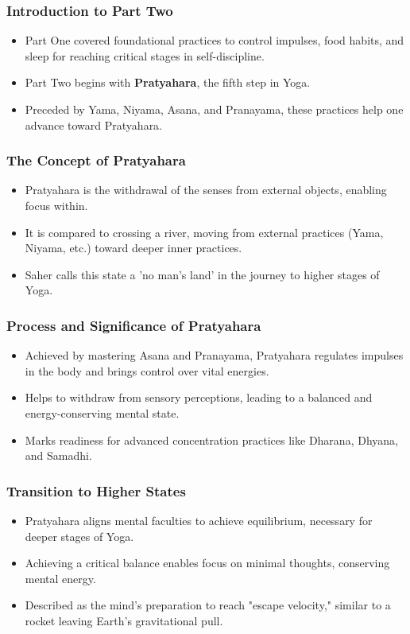 \begin{frame}[fragile]\frametitle{Introduction to Part Two}
    \begin{itemize}
        \item Part One covered foundational practices to control impulses, food habits, and sleep for reaching critical stages in self-discipline.
        \item Part Two begins with \textbf{Pratyahara}, the fifth step in Yoga.
        \item Preceded by Yama, Niyama, Asana, and Pranayama, these practices help one advance toward Pratyahara.
    \end{itemize}
\end{frame}

\begin{frame}[fragile]\frametitle{The Concept of Pratyahara}
    \begin{itemize}
        \item Pratyahara is the withdrawal of the senses from external objects, enabling focus within.
        \item It is compared to crossing a river, moving from external practices (Yama, Niyama, etc.) toward deeper inner practices.
        \item Saher calls this state a 'no man's land' in the journey to higher stages of Yoga.
    \end{itemize}
\end{frame}

\begin{frame}[fragile]\frametitle{Process and Significance of Pratyahara}
    \begin{itemize}
        \item Achieved by mastering Asana and Pranayama, Pratyahara regulates impulses in the body and brings control over vital energies.
        \item Helps to withdraw from sensory perceptions, leading to a balanced and energy-conserving mental state.
        \item Marks readiness for advanced concentration practices like Dharana, Dhyana, and Samadhi.
    \end{itemize}
\end{frame}

\begin{frame}[fragile]\frametitle{Transition to Higher States}
    \begin{itemize}
        \item Pratyahara aligns mental faculties to achieve equilibrium, necessary for deeper stages of Yoga.
        \item Achieving a critical balance enables focus on minimal thoughts, conserving mental energy.
        \item Described as the mind's preparation to reach "escape velocity," similar to a rocket leaving Earth's gravitational pull.
    \end{itemize}
\end{frame}

